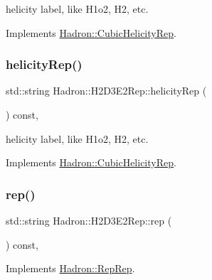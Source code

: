 helicity label, like H1o2, H2, etc. 

Implements \mbox{\hyperlink{structHadron_1_1CubicHelicityRep_af1096946b7470edf0a55451cc662f231}{Hadron\+::\+Cubic\+Helicity\+Rep}}.

\mbox{\label{structHadron_1_1H2D3E2Rep_af42edde155e8d26e4f67fa592d7023d0}} 
\subsubsection{\texorpdfstring{helicityRep()}{helicityRep()}\hspace{0.1cm}{\footnotesize\ttfamily [3/3]}}
{\footnotesize\ttfamily std\+::string Hadron\+::\+H2\+D3\+E2\+Rep\+::helicity\+Rep (\begin{DoxyParamCaption}{ }\end{DoxyParamCaption}) const\hspace{0.3cm}{\ttfamily [inline]}, {\ttfamily [virtual]}}

helicity label, like H1o2, H2, etc. 

Implements \mbox{\hyperlink{structHadron_1_1CubicHelicityRep_af1096946b7470edf0a55451cc662f231}{Hadron\+::\+Cubic\+Helicity\+Rep}}.

\mbox{\label{structHadron_1_1H2D3E2Rep_a1e87b376344ff9529dd7f69395f739fa}} 
\subsubsection{\texorpdfstring{rep()}{rep()}\hspace{0.1cm}{\footnotesize\ttfamily [1/5]}}
{\footnotesize\ttfamily std\+::string Hadron\+::\+H2\+D3\+E2\+Rep\+::rep (\begin{DoxyParamCaption}{ }\end{DoxyParamCaption}) const\hspace{0.3cm}{\ttfamily [inline]}, {\ttfamily [virtual]}}



Implements \mbox{\hyperlink{structHadron_1_1RepRep_ab3213025f6de249f7095892109575fde}{Hadron\+::\+Rep\+Rep}}.

\mbox{\label{structHadron_1_1H2D3E2Rep_a1e87b376344ff9529dd7f69395f739fa}} 
